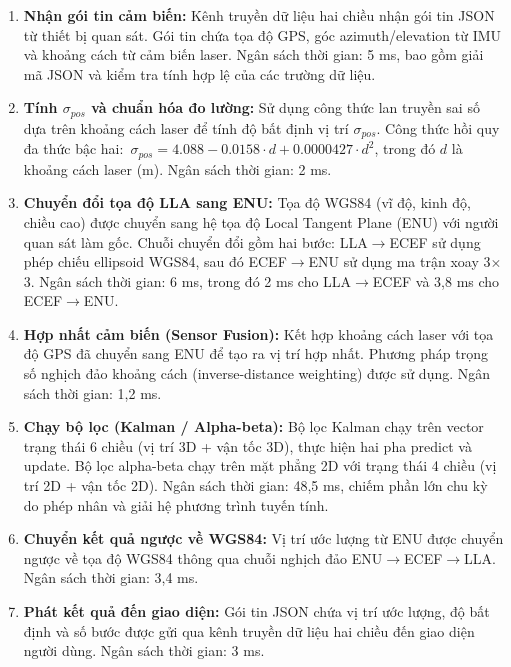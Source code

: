 \begin{enumerate}
    \item \textbf{Nhận gói tin cảm biến:} Kênh truyền dữ liệu hai chiều nhận gói tin JSON từ thiết bị quan sát. Gói tin chứa tọa độ GPS, góc azimuth/elevation từ IMU và khoảng cách từ cảm biến laser. Ngân sách thời gian: 5 ms, bao gồm giải mã JSON và kiểm tra tính hợp lệ của các trường dữ liệu.

    \item \textbf{Tính $\sigma_{pos}$ và chuẩn hóa đo lường:} Sử dụng công thức lan truyền sai số dựa trên khoảng cách laser để tính độ bất định vị trí $\sigma_{pos}$. Công thức hồi quy đa thức bậc hai:\ $\sigma_{pos} = 4.088 - 0.0158 \cdot d + 0.0000427 \cdot d^2$, trong đó $d$ là khoảng cách laser (m). Ngân sách thời gian: 2 ms.

    \item \textbf{Chuyển đổi tọa độ LLA sang ENU:} Tọa độ WGS84 (vĩ độ, kinh độ, chiều cao) được chuyển sang hệ tọa độ Local Tangent Plane (ENU) với người quan sát làm gốc. Chuỗi chuyển đổi gồm hai bước: LLA$\to$ECEF sử dụng phép chiếu ellipsoid WGS84, sau đó ECEF$\to$ENU sử dụng ma trận xoay 3$\times$3. Ngân sách thời gian: 6 ms, trong đó 2 ms cho LLA$\to$ECEF và 3,8 ms cho ECEF$\to$ENU.

    \item \textbf{Hợp nhất cảm biến (Sensor Fusion):} Kết hợp khoảng cách laser với tọa độ GPS đã chuyển sang ENU để tạo ra vị trí hợp nhất. Phương pháp trọng số nghịch đảo khoảng cách (inverse-distance weighting) được sử dụng. Ngân sách thời gian: 1,2 ms.

    \item \textbf{Chạy bộ lọc (Kalman / Alpha-beta):} Bộ lọc Kalman chạy trên vector trạng thái 6 chiều (vị trí 3D + vận tốc 3D), thực hiện hai pha predict và update. Bộ lọc alpha-beta chạy trên mặt phẳng 2D với trạng thái 4 chiều (vị trí 2D + vận tốc 2D). Ngân sách thời gian: 48,5 ms, chiếm phần lớn chu kỳ do phép nhân và giải hệ phương trình tuyến tính.

    \item \textbf{Chuyển kết quả ngược về WGS84:} Vị trí ước lượng từ ENU được chuyển ngược về tọa độ WGS84 thông qua chuỗi nghịch đảo ENU$\to$ECEF$\to$LLA. Ngân sách thời gian: 3,4 ms.

    \item \textbf{Phát kết quả đến giao diện:} Gói tin JSON chứa vị trí ước lượng, độ bất định và số bước được gửi qua kênh truyền dữ liệu hai chiều đến giao diện người dùng. Ngân sách thời gian: 3 ms.
\end{enumerate}

